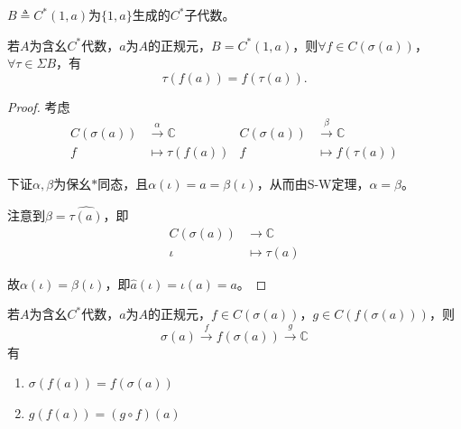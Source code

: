 \documentclass[lang=cn,a4paper,newtx,section]{elegantbook}
\begin{document}
\begin{definition}
  $B \triangleq C^*(1, a)$为$\{1, a\}$生成的$C^*$子代数。
\end{definition}

\begin{lemma}
  若$A$为含幺$C^*$代数，$a$为$A$的正规元，$B = C^*(1, a)$，则$\forall f \in C(\sigma(a))$，$\forall \tau \in \Sigma B$，有
  \begin{equation*}
    \tau(f(a)) = f(\tau(a)).
  \end{equation*}
\end{lemma}

\begin{proof}
  考虑
  \begin{equation*}
    \begin{aligned}
      C(\sigma(a)) &\xrightarrow{\alpha} \mathbb{C} & C(\sigma(a)) &\xrightarrow{\beta} \mathbb{C} \\
      f &\longmapsto \tau(f(a)) & f &\longmapsto f(\tau(a))
    \end{aligned}
  \end{equation*}
  
  下证$\alpha, \beta$为保幺$*$同态，且$\alpha(\iota) = a = \beta(\iota)$，从而由S-W定理，$\alpha = \beta$。
  
  注意到$\beta = \widehat{\tau(a)}$，即
  \begin{equation*}
    \begin{aligned}
      C(\sigma(a)) &\longrightarrow \mathbb{C} \\
      \iota &\longmapsto \tau(a)
    \end{aligned}
  \end{equation*}
  
  故$\alpha(\iota) = \beta(\iota)$，即$\hat{a}(\iota) = \iota(a) = a$。
\end{proof}

\begin{theorem}[谱映射定理]
  若$A$为含幺$C^*$代数，$a$为$A$的正规元，$f \in C(\sigma(a))$，$g \in C(f(\sigma(a)))$，则
  \begin{equation*}
    \sigma(a) \xrightarrow{f} f(\sigma(a)) \xrightarrow{g} \mathbb{C}
  \end{equation*}
  有
  \begin{enumerate}
    \item $\sigma(f(a)) = f(\sigma(a))$
    \item $g(f(a)) = (g \circ f)(a)$
  \end{enumerate}
\end{theorem}
\end{document}

